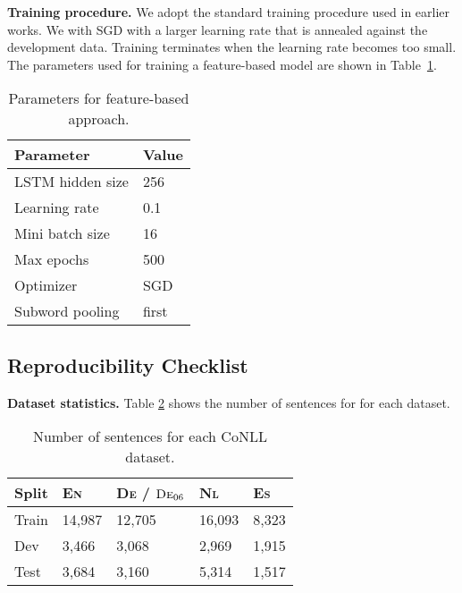 \documentclass[11pt,a4paper]{article}
\begin{document}
\noindent 
\textbf{Training procedure.} We adopt the standard training procedure used in earlier works. We with SGD with a larger learning rate that is annealed against the development data. Training terminates when the learning rate becomes too small. 
The parameters used for training a feature-based model are shown in Table~\ref{ner-training-parameters-feature-based}. 








\begin{table}[h!]
\begin{center}
\begin{tabular}{ l l }
\toprule
Parameter & Value \\
\midrule
LSTM hidden size & 256 \\
Learning rate & 0.1 \\
Mini batch size & 16 \\
Max epochs & 500 \\
Optimizer & SGD \\
Subword pooling & first \\
\bottomrule
\end{tabular}
\end{center}
\caption{\label{ner-training-parameters-feature-based} Parameters for feature-based approach.}
\end{table}

\subsection{Reproducibility Checklist}

\noindent 
\textbf{Dataset statistics.} Table \ref{tab:dataset_stats} shows the number of sentences for for each dataset.

\begin{table}[h!]
\centering
\begin{tabular}{lllll}
\hline
 Split       &  \textsc{En} & \textsc{De} / $\textsc{De}_{06}$ & \textsc{Nl} & \textsc{Es} \\ \hline
 Train       & 14,987       & 12,705                           & 16,093      & 8,323 \\
 Dev         & 3,466        & 3,068                            & 2,969       & 1,915 \\
 Test        & 3,684        & 3,160                            & 5,314       & 1,517 \\
 \hline
\end{tabular}\caption{Number of sentences for each CoNLL dataset.}
\label{tab:dataset_stats}
\end{table}
\end{document}
